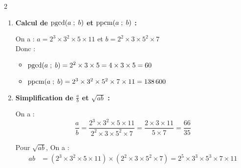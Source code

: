 \documentclass[10pt, a4paper]{article}
\begin{document}
\begin{multicols*}{2}
\begin{Solution}[APPLICATION][12]
\begin{enumerate}[leftmargin=*,itemsep=0.5pt]
    \begin{multicols}{2}
    \[
    \begin{array}{r|l}
    3960 & 2 \\
    1980 & 2 \\
    990  & 2 \\
    495  & 3 \\
    165  & 3 \\
    55   & 5 \\
    11   & 11 \\
    1    &
    \end{array}
    \]

    \columnbreak

    \[
    \begin{array}{r|l}
    2100 & 2 \\
    1050 & 2 \\
    525  & 3 \\
    175  & 5 \\
    35   & 5 \\
    7    & 7 \\
    1    &
    \end{array}
    \]

    \end{multicols}
        Donc $a = 2^3 \times 3^2 \times 5 \times 11$ \quad et \quad $b = 2^2 \times 3 \times 5^2 \times 7$.

    \item \textbf{Calcul de $\operatorname{pgcd}(a \; ; \; b)$ et $\operatorname{ppcm}(a \; ; \; b)$ :}

    On a : $a = 2^3 \times 3^2 \times 5 \times 11$ \quad et \quad $b = 2^2 \times 3 \times 5^2 \times 7$ \\
    Donc :
    \begin{itemize}[leftmargin=*,itemsep=0.5pt]
        \item $\operatorname{pgcd}(a \; ; \; b) = 2^2 \times 3 \times 5 = 4 \times 3 \times 5 = 60$

        \item $\operatorname{ppcm}(a \; ; \; b) = 2^3 \times 3^2 \times 5^2 \times 7 \times 11 = 138\,600$
    \end{itemize}

    \item \textbf{Simplification de $\frac{a}{b}$ et $\sqrt{ab}$ :}

    On a :
    \[\frac{a}{b} = \frac{2^3 \times 3^2 \times 5 \times 11}{2^2 \times 3 \times 5^2 \times 7} = \frac{2 \times 3 \times 11}{5 \times 7} = \frac{66}{35}\]


    Pour $\sqrt{ab}$, On a :
    \begin{align*}
        ab &= (2^3 \times 3^2 \times 5 \times 11) \times (2^2 \times 3 \times 5^2 \times 7) = 2^5 \times 3^3 \times 5^3 \times 7 \times 11
    \end{align*}


\end{enumerate}
\end{Solution}
\end{multicols*}
\end{document}
